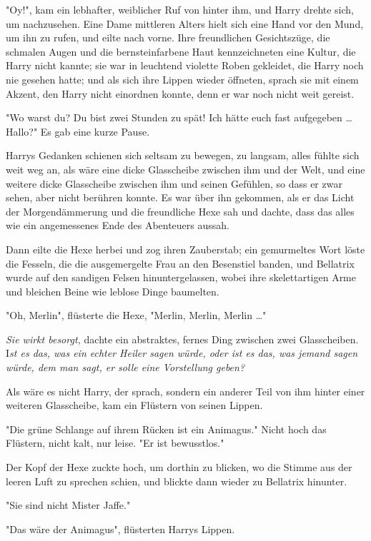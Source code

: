 {"Oy!", kam ein lebhafter, weiblicher Ruf von hinter ihm, und Harry drehte sich, um nachzusehen. Eine Dame mittleren Alters hielt sich eine Hand vor den Mund, um ihn zu rufen, und eilte nach vorne. Ihre freundlichen Gesichtszüge, die schmalen Augen und die bernsteinfarbene Haut kennzeichneten eine Kultur, die Harry nicht kannte; sie war in leuchtend violette Roben gekleidet, die Harry noch nie gesehen hatte; und als sich ihre Lippen wieder öffneten, sprach sie mit einem Akzent, den Harry nicht einordnen konnte, denn er war noch nicht weit gereist.

"Wo warst du? Du bist zwei Stunden zu spät! Ich hätte euch fast aufgegeben … Hallo?" Es gab eine kurze Pause.

Harrys Gedanken schienen sich seltsam zu bewegen, zu langsam, alles fühlte sich weit weg an, als wäre eine dicke Glasscheibe zwischen ihm und der Welt, und eine weitere dicke Glasscheibe zwischen ihm und seinen Gefühlen, so dass er zwar sehen, aber nicht berühren konnte. Es war über ihn gekommen, als er das Licht der Morgendämmerung und die freundliche Hexe sah und dachte, dass das alles wie ein angemessenes Ende des Abenteuers aussah.

Dann eilte die Hexe herbei und zog ihren Zauberstab; ein gemurmeltes Wort löste die Fesseln, die die ausgemergelte Frau an den Besenstiel banden, und Bellatrix wurde auf den sandigen Felsen hinuntergelassen, wobei ihre skelettartigen Arme und bleichen Beine wie leblose Dinge baumelten.

"Oh, Merlin", flüsterte die Hexe, "Merlin, Merlin, Merlin …"

\emph{Sie wirkt besorgt,} dachte ein abstraktes, fernes Ding zwischen zwei Glasscheiben. I\emph{st es das, was ein echter Heiler sagen würde, oder ist es das, was jemand sagen würde, dem man sagt, er solle eine Vorstellung geben?}

Als wäre es nicht Harry, der sprach, sondern ein anderer Teil von ihm hinter einer weiteren Glasscheibe, kam ein Flüstern von seinen Lippen.

"Die grüne Schlange auf ihrem Rücken ist ein Animagus." Nicht hoch das Flüstern, nicht kalt, nur leise. "Er ist bewusstlos."

Der Kopf der Hexe zuckte hoch, um dorthin zu blicken, wo die Stimme aus der leeren Luft zu sprechen schien, und blickte dann wieder zu Bellatrix hinunter.

"Sie sind nicht Mister Jaffe."

"Das wäre der Animagus", flüsterten Harrys Lippen.

}
